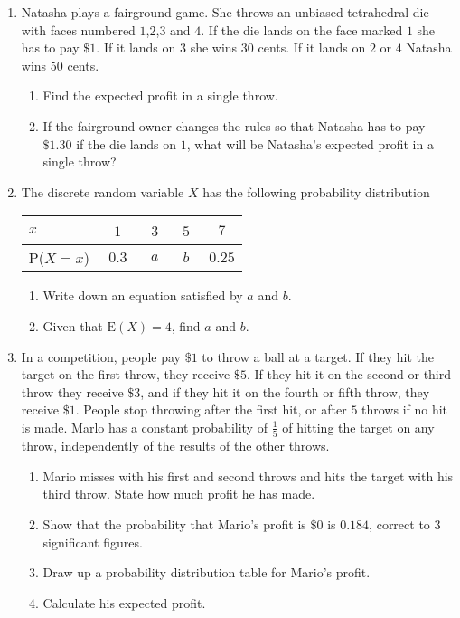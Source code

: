 \exercise  %


\begin{enumerate}
	\item Natasha plays a fairground game. She throws an unbiased tetrahedral die with faces numbered $1$,$2$,$3$ and $4$. If the die lands on the face marked $1$ she has to pay $\$ 1$. If it lands on $3$ she wins $30$ cents. If it lands on $2$ or $4$ Natasha wins $50$ cents.
	
	\begin{enumerate}
		\item Find the expected profit in a single throw.
		\item If the fairground owner changes the rules so that Natasha has to pay $\$1.30$ if the die lands on $1$, what will be Natasha's expected profit in a single throw?
	\end{enumerate}   


\item The discrete random variable $X$ has the following probability distribution

\begin{table}[!htpb]
	\centering
	\begin{tabular}{|l|c|c|c|c|}
		\hline
		$x $     & \,\, $1$ \,\, & \,\,$3$\,\, & \,\,$5$\,\, &  $7$ \\ \hline
		P($X=x$) & $0.3$ & $a$ & $b$ &  $0.25$ \\ \hline
	\end{tabular}
\end{table}

\begin{enumerate}
	\item Write down an equation satisfied by $a$ and $b$.
	\item Given that $\text{E}(X) = 4$, find $a$ and $b$.
\end{enumerate}

\item In a competition, people pay $\$ 1$ to throw a ball at a target. If they hit the target on the first throw, they receive $\$ 5$. If they hit it on  the second or third throw they receive $\$ 3$, and if they hit it on the fourth or fifth throw, they receive $\$ 1$. People stop throwing after the first hit, or after $5$ throws if no hit is made. Marlo has a constant probability of $\frac{1}{5}$ of hitting the target on any throw, independently of the results of the other throws.

\begin{enumerate}
	\item Mario misses with his first and second throws and hits the target with his third throw. State how much profit he has made.
	\item Show that the probability that Mario's profit is $\$ 0$ is $0.184$, correct to $3$ significant figures.
	\item Draw up a probability distribution table for Mario's profit.
	\item Calculate his expected profit.
\end{enumerate}



\end{enumerate}

